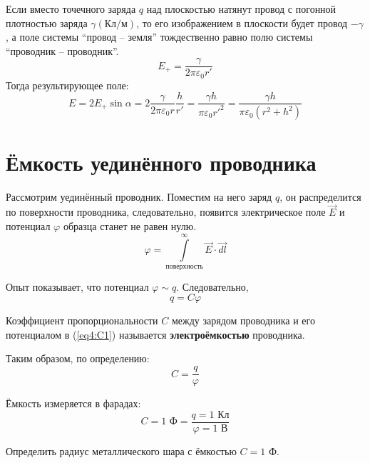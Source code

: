     \begin{remark}
        Если вместо точечного заряда \( q \) над плоскостью натянут провод с 
        погонной плотностью заряда \( \gamma (\text{Кл}/\text{м})\), то
        его изображением в плоскости будет провод \( -\gamma \), а поле системы 
        ``провод -- земля'' тождественно равно полю системы ``проводник --
        проводник''.
        \[
            E_{+} = \frac{\gamma}{2\pi\varepsilon_0 r'} \nonumber
        \]
        Тогда результирующее поле:
        \[
            E = 2E_{+}\sin\alpha = 2\frac{\gamma}{2\pi\varepsilon_0 r}
            \frac{h}{r'} = \frac{\gamma h}{\pi\varepsilon_0 {r'}^2} =
            \frac{\gamma h}{\pi\varepsilon_0(r^2 + h^2)}
        \]
    \end{remark}

\section{Ёмкость уединённого проводника}

    Рассмотрим уединённый проводник. Поместим на него заряд \( q \), он 
    распределится по поверхности проводника, следовательно, появится
    электрическое поле \( \vec{E} \) и потенциал \( \varphi \) образца станет
    не равен нулю.
    \[
        \varphi = \int\limits_{\textit{поверхность}}^{\infty}
        \vec{E}\cdot\vec{dl}
    \]

    Опыт показывает, что потенциал \( \varphi \sim q \). Следовательно,
    \begin{equation}
        \label{eq4:C1}
        q = C\varphi
    \end{equation}

    \begin{definition}
        Коэффициент пропорциональности  \( C \) между зарядом проводника и его 
        потенциалом в (\ref{eq4:C1}) называется \textbf{электроёмкостью}
        проводника.
    \end{definition}

    Таким образом, по определению:
    \[
        C = \frac{q}{\varphi}
    \]

    Ёмкость измеряется в фарадах:
    \[
        C = 1\text{ Ф} = \frac{q = 1 \text{ Кл}}{\varphi = 1 \text{ В}}
    \]

    \begin{example}
        Определить радиус металлического шара с ёмкостью \( C = 1\) Ф.
    \end{example}

